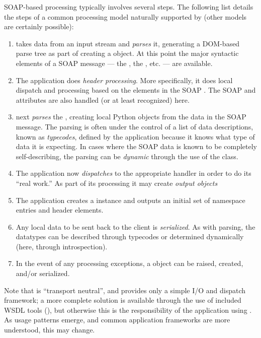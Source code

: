 SOAP-based processing typically involves several steps.
The following list details the steps of a common processing model naturally
supported by \ZSI{} (other models are certainly possible):
\begin{enumerate}
\item
    \ZSI{} takes data from an input stream and \emph{parses} it, generating
    a DOM-based parse tree as part of creating a  object.
    At this point the major syntactic elements of a SOAP message --- the
    , the , etc. --- are available.
\item
    The application does \emph{header processing}.
    More specifically, it does local dispatch and processing based on
    the elements in the SOAP .
    The SOAP  and  attributes are
    also handled (or at least recognized) here.
\item
    \ZSI{} next \emph{parses} the , creating local Python objects
    from the data in the SOAP message.
    The parsing is often under the control of a list of data descriptions,
    known as \emph{typecodes}, defined by the application because it knows
    what type of data it is expecting.
    In cases where the SOAP data is known to be completely self-describing,
    the parsing can be \emph{dynamic} through the use of the 
    class.
\item
    The application now \emph{dispatches} to the appropriate handler
    in order to do its ``real work.''
    As part of its processing it may create \emph{output objects}
\item
    The application creates a  instance and outputs
    an initial set of namespace entries and header elements.
\item
    Any local data to be sent back to the client is \emph{serialized}.
    As with  parsing, the datatypes can be described through
    typecodes or determined dynamically (here, through introspection).
\item
    In the event of any processing exceptions, a  object
    can be raised, created, and/or serialized.
\end{enumerate}

Note that \ZSI{} is ``transport neutral'', and provides only a simple
I/O and dispatch framework; a more complete solution is available through
the use of included WSDL tools (), but otherwise this is
the responsibility of the application using \ZSI{}.  As usage patterns
emerge, and common application frameworks are more understood, this may
change.



